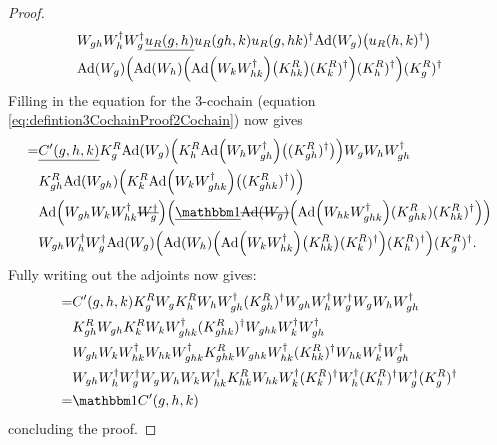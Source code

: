 \documentclass[12pt,a4paper,twoside]{article}
\numberwithin{equation}{section}
\begin{document}
\begin{proof}
\begin{align}
		\nonumber
		&W_{gh}W_h^\dagger W_g^\dagger \underline{u_R(g,h)} u_R(gh,k)u_R(g,hk)^\dagger\Ad{W_g}\left(u_R(h,k)^\dagger\right)\\
		\nonumber
		&\Ad{W_g}\left(\Ad{W_h}\left(\Ad{W_kW_{hk}^\dagger}\left(K_{hk}^R\right)(K^R_k)^\dagger\right)(K^R_h)^\dagger\right)(K^R_g)^\dagger
	\end{align}
	Filling in the equation for the 3-cochain (equation \eqref{eq:defintion3CochainProof2Cochain}) now gives
	\begin{align}
		=&\underline{C'(g,h,k)}K_g^R\Ad{W_g}\left(K_h^R\Ad{W_hW_{gh}^\dagger}\left((K_{gh}^R)^\dagger\right)\right)W_gW_hW_{gh}^\dagger \\
		\nonumber
		&K_{gh}^R\Ad{W_{gh}}\left(K_k^R\Ad{W_kW_{ghk}^\dagger}\left((K_{ghk}^R)^\dagger\right)\right)\\
		\nonumber
		&\Ad{W_{gh}W_kW_{hk}^\dagger \stkout{W_{g}^\dagger}}  \left(\underline{\id}\stkout{\Ad{W_g}}\left( \Ad{W_{hk}W_{ghk}^\dagger}(K^R_{ghk})(K^R_{hk})^{\dagger} \right)\right)\\
		\nonumber
		&W_{gh}W_h^\dagger W_g^\dagger\Ad{W_g}\left(\Ad{W_h}\left(\Ad{W_kW_{hk}^\dagger}\left(K_{hk}^R\right)(K^R_k)^\dagger\right)(K^R_h)^\dagger\right)(K^R_g)^\dagger.
	\end{align}
	Fully writing out the adjoints now gives:
	\begin{align}
		=&C'(g,h,k)K_g^RW_gK_h^RW_hW_{gh}^\dagger (K_{gh}^R)^\dagger W_{gh}W_h^\dagger W_g^\dagger W_gW_hW_{gh}^\dagger \\
		\nonumber
		&K_{gh}^RW_{gh}K_k^RW_kW_{ghk}^\dagger(K_{ghk}^R)^\dagger W_{ghk}W_k^\dagger W_{gh}^\dagger  \\
		\nonumber
		&W_{gh}W_kW_{hk}^\dagger W_{hk}W_{ghk}^\dagger K^R_{ghk} W_{ghk}W_{hk}^\dagger(K^R_{hk})^{\dagger} W_{hk}W_k^\dagger W_{gh}^\dagger\\
		\nonumber
		&W_{gh}W_h^\dagger W_g^\dagger W_gW_h W_kW_{hk}^\dagger K_{hk}^RW_{hk}W_k^\dagger(K^R_k)^\dagger W_h^\dagger (K^R_h)^\dagger W_g^\dagger (K^R_g)^\dagger\\
		=&\id C'(g,h,k)
	\end{align}
	concluding the proof.
\end{proof}
\end{document}
